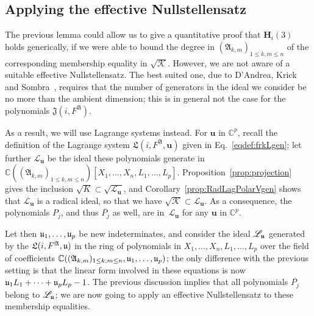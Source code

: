 \documentclass[12pt]{article}
\def\frkJ{\mathfrak{J}}
\def\frkL{\mathfrak{L}}
\def\A{\mathfrak{A}}
\def\C{\mathbb{C}}
\begin{document}

\subsection{Applying the effective Nullstellensatz}

The previous lemma could allow us to give a quantitative proof that
$\bm H_i(3)$ holds generically, if we were able to bound the degree in
$(\A_{k,m})_{1 \le k,m \le n}$ of the corresponding membership
equality in $\sqrt{\mathscr{K}}$. However, we are not aware of a
suitable effective Nullstellensatz. The best suited one, due to
D'Andrea, Krick and Sombra~\cite{EN}, requires that the number of
generators in the ideal we consider be no more than the ambient
dimension; this is in general not the case for the polynomials
${\frkJ}(i, F^\A)$.

As a result, we will use Lagrange systems instead. For $\bm u$ in
$\C^p$, recall the definition of the Lagrange system ${\frkL}(i, F^\A,
\bm u)$ given in Eq.~\eqref{eqdef:frkLgen}; let further
$\mathscr{L}_{\bm u}$ be the ideal these polynomials generate in
$\C((\A_{k,m})_{1 \le k,m \le n})[X_1,\dots,X_n,L_1,\dots,L_p]$.
Proposition~\ref{prop:projection} gives the inclusion $\sqrt{K}
\subset \sqrt{\mathscr{L}_{\bm u}}$, and
Corollary~\ref{prop:RadLagPolarVgen} shows that $\mathscr{L}_{\bm u}$ is
a radical ideal, so that we have $\sqrt{\mathscr{K}} \subset
\mathscr{L}_{\bm u}$. As a consequence, the polynomials $P_j$, and
thus $\overline{P_j}$ as well, are in~$\mathscr{L}_{\bm u}$ for
any $\bm u$ in $\C^p$.

Let then $\frak u_1,\dots,\frak u_p$ be new indeterminates, and
consider the ideal $\mathscr{L}_{\bm{\frak u}}$ generated by the
${\frkL}(i, F^\A, \frak u)$ in the ring of polynomials in
$X_1,\dots,X_n,L_1,\dots,L_p$ over the field of coefficients
$\C((\A_{k,m})_{1 \le k,m \le n},\frak u_1,\dots,\frak u_p)$; the only
difference with the previous setting is that the linear form involved
in these equations is now $\frak u_1 L_1 + \cdots + \frak u_p
L_p-1$. The previous discussion implies that all polynomials
$\overline{P_j}$ belong to $\mathscr{L}_{\bm{\frak u}}$; we are now
going to apply an effective Nullstellensatz to these membership
equalities.
\end{document}

